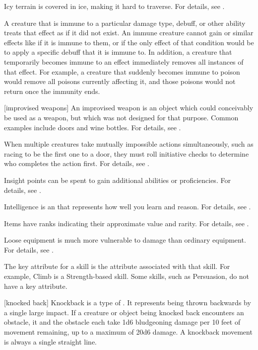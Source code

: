  Icy terrain is covered in ice, making it hard to traverse.
For details, see .

 A creature that is immune to a particular damage type, debuff, or other ability treats that effect as if it did not exist.
An immune creature cannot gain  or similar effects like  if it is immune to them, or if the only effect of that condition would be to apply a specific debuff that it is immune to.
In addition, a creature that temporarily becomes immune to an effect immediately removes all instances of that effect.
For example, a creature that suddenly becomes immune to poison would remove all poisons currently affecting it, and those poisons would not return once the immunity ends.

[improvised weapons] An improvised weapon is an object which could conceivably be used as a weapon, but which was not designed for that purpose.
Common examples include doors and wine bottles.
For details, see .

 When multiple creatures take mutually impossible actions simultaneously, such as racing to be the first one to a door, they must roll initiative checks to determine who completes the action first.
For details, see .

 Insight points can be spent to gain additional abilities or proficiencies.
For details, see .

 Intelligence is an  that represents how well you learn and reason.
For details, see .

 Items have ranks indicating their approximate value and rarity.
For details, see .

 Loose equipment is much more vulnerable to damage than ordinary equipment.
For details, see .

 The key attribute for a skill is the attribute associated with that skill.
For example, Climb is a Strength-based skill.
Some skills, such as Persuasion, do not have a key attribute.

[knocked back] Knockback is a type of .
It represents being thrown backwards by a single large impact.
If a creature or object being knocked back encounters an obstacle, it and the obstacle each take 1d6 bludgeoning damage per 10 feet of movement remaining, up to a maximum of 20d6 damage.
A knockback movement is always a single straight line.


